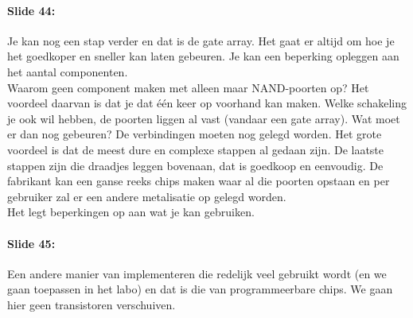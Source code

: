 \documentclass[10pt,a4paper]{book}
\begin{document}
\paragraph{Slide 44:} Je kan nog een stap verder en dat is de gate array. Het gaat er altijd om hoe je het goedkoper en sneller kan laten gebeuren. Je kan een beperking opleggen aan het aantal componenten.\\
Waarom geen component maken met alleen maar NAND-poorten op? Het voordeel daarvan is dat je dat \'e\'en keer op voorhand kan maken. Welke schakeling je ook wil hebben, de poorten liggen al vast (vandaar een gate array). Wat moet er dan nog gebeuren? De verbindingen moeten nog gelegd worden. Het grote voordeel is dat de meest dure en complexe stappen al gedaan zijn. De laatste stappen zijn die draadjes leggen bovenaan, dat is goedkoop en eenvoudig. De fabrikant kan een ganse reeks chips maken waar al die poorten opstaan en per gebruiker zal er een andere metalisatie op gelegd worden.\\
Het legt beperkingen op aan wat je kan gebruiken.

\paragraph{Slide 45:} Een andere manier van implementeren die redelijk veel gebruikt wordt (en we gaan toepassen in het labo) en dat is die van programmeerbare chips. We gaan hier geen transistoren verschuiven. 
\end{document}
